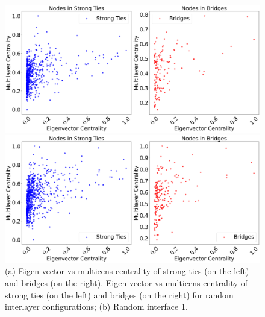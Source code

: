 \documentclass[10pt,letterpaper]{article}
\begin{document}
\begin{figure}[h!]
	\centering
	\begin{minipage}[b]{0.44\linewidth}
		\centering
		\includegraphics[width=\textwidth]{figs/fig9.png}
		\subcaption{}
	\end{minipage}
	\hspace{0.5cm}
	\begin{minipage}[b]{0.44\linewidth}
		\centering
		\includegraphics[width=\textwidth]{figs/fig10.png}
		\subcaption{}
	\end{minipage}
	\caption{(a) Eigen vector vs multicens centrality of strong ties (on the left) and bridges (on the right). Eigen vector vs multicens centrality of strong ties (on the left) and bridges (on the right) for random interlayer configurations; (b) Random interface 1. \label{fig:ties1}}
\end{figure}
\end{document}
